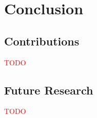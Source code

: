 \chapter{Conclusion}
\label{chap:conclusion}


\section{Contributions}
\textcolor{red}{TODO}

\section{Future Research}
\textcolor{red}{TODO}


